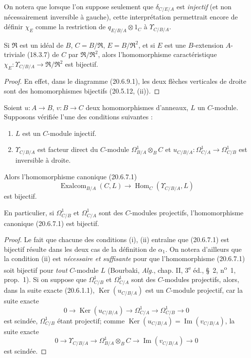 On notera que lorsque l'on suppose seulement que $\delta_{C/E/A}$ est
\emph{injectif} (et non nécessairement inversible à gauche), cette
interprétation permettrait encore de définir $\chi_E$ comme la
restriction de $q_{E/B/A}\otimes1_C$ à $\Upsilon_{C/B/A}$.

\begin{corollary}[20.6.10]
\label{0.20.6.10-fr}
Si $\mathfrak{R}$ est un idéal de $B$, $C=B/\mathfrak{R}$,
$E=B/\mathfrak{R}^2$, et si $E$ est une $B$-extension $A$-triviale
(18.3.7) de $C$ par $\mathfrak{R}/\mathfrak{R}^2$, alors
l'homomorphisme caractéristique
$\chi_E:\Upsilon_{C/B/A}\to\mathfrak{R}/\mathfrak{R}^2$ est bijectif.
\end{corollary}

\begin{proof}
En effet, dans le diagramme (20.6.9.1), les deux flèches verticales de
droite sont des homomorphismes bijectifs (20.5.12, (ii)).
\end{proof}

\begin{theorem}[20.6.11]
\label{0.20.6.11-fr}
Soient $u:A\to B$, $v:B\to C$ deux homomorphismes d'anneaux, $L$ un
$C$-module. Supposons vérifiée l'une des conditions suivantes :
\begin{enumerate}
  \item[\rm(i)] $L$ est un $C$-module injectif.
  \item[\rm(ii)] $\Upsilon_{C/B/A}$ est facteur direct du $C$-module
$\Omega^1_{B/A}\otimes_B C$ et
$u_{C/B/A}:\Omega^1_{C/A}\to\Omega^1_{C/B}$ est inversible à droite.
\end{enumerate}
Alors l'homomorphisme canonique (20.6.7.1)
\[
  \operatorname{Exalcom}_{B/A}(C,L)\longrightarrow
  \operatorname{Hom}_C(\Upsilon_{C/B/A},L)
\]
est bijectif.

En particulier, si $\Omega^1_{C/B}$ et $\Omega^1_{C/A}$ sont des
$C$-modules projectifs, l'homomorphisme canonique (20.6.7.1) est
bijectif.
\end{theorem}

\begin{proof}
Le fait que chacune des conditions (i), (ii) entraîne que (20.6.7.1) est
bijectif résulte dans les deux cas de la définition de $\alpha_1$. On
notera d'ailleurs que la condition (ii) est \emph{nécessaire et
suffisante} pour que l'homomorphisme (20.6.7.1) soit bijectif pour
\emph{tout} $C$-module $L$ (Bourbaki, \emph{Alg.}, chap. II,
3\textsuperscript{e} éd., \S~2, n\textsuperscript{o}~1, prop.~1). Si on
suppose que $\Omega^1_{C/B}$ et $\Omega^1_{C/A}$ sont des $C$-modules
projectifs, alors, dans la suite exacte (20.6.1.1),
$\operatorname{Ker}(u_{C/B/A})$ est un $C$-module projectif, car la suite exacte
\[
  0\longrightarrow\operatorname{Ker}(u_{C/B/A})\longrightarrow\Omega^1_{C/A}
  \longrightarrow\Omega^1_{C/B}\longrightarrow0
\]
est scindée, $\Omega^1_{C/B}$ étant projectif; comme
$\operatorname{Ker}(u_{C/B/A})=\operatorname{Im}(v_{C/B/A})$, la suite exacte
\[
  0\longrightarrow\Upsilon_{C/B/A}\longrightarrow
  \Omega^1_{B/A}\otimes_B C\longrightarrow
  \operatorname{Im}(v_{C/B/A})\longrightarrow0
\]
est scindée.
\end{proof}

